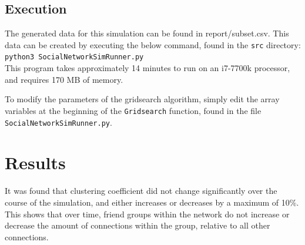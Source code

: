 \documentclass{article}
\begin{document}
\subsection{Execution}
The generated data for this simulation can be found in report/subset.csv.
This data can be created by executing the below command, found in the \texttt{src} directory:\\
\texttt{python3 SocialNetworkSimRunner.py}\\
This program takes approximately 14 minutes to run on an i7-7700k processor,
and requires 170 MB of memory.

To modify the parameters of the gridsearch algorithm,
simply edit the array variables at the beginning of the \texttt{Gridsearch}
function, found in the file \texttt{SocialNetworkSimRunner.py}.

\section{Results}

It was found that clustering coefficient did not change significantly over the
course of the simulation, and either increases or decreases by a maximum of 10\%.
This shows that over time, friend groups within the network do not increase
or decrease the amount of connections within the group, relative to all other connections.
\end{document}
